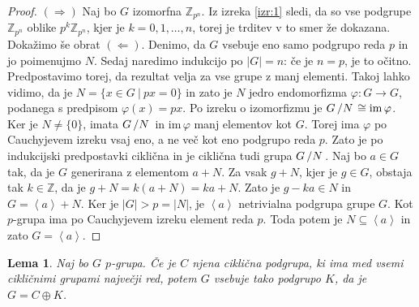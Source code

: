 \documentclass[10pt, a4paper]{article}
\newtheorem{lema}[izr]{Lema}
\newenvironment{noticeC}{%
  \tcolorbox[%
  notitle,
  empty,
  enhanced,  %
  breakable,
  coltext=black, 
  fontupper=\rmfamily,
  parbox=false,
  noparskip,
  sharp corners,
  boxrule=-1pt,  %
  frame hidden,
  left=7pt,  %
  right=7pt,
  top=5pt,
  bottom=5pt,
  before skip=2.5ex plus 2pt,
  after skip=2.5ex plus 2pt,
  overlay unbroken and last={%
  },
  ]}
{\endtcolorbox}
\newenvironment{dokaz}%
  {\begin{noticeC}\begin{proof}}%
  {\end{proof}\end{noticeC}}
\newcommand{\Z}{\mathbb {Z}}
\newcommand{\quot}[2]{{\raisebox{0em}{$#1$}\left/\raisebox{0em}{$#2$}\right.}}
\newcommand{\gen}[1]{\left\langle #1 \right\rangle}
\newcommand{\im}{\mathrm{im}\,}
\begin{document}
\begin{dokaz}
  $(\Rightarrow)$ Naj bo $G$ izomorfna $\Z_{p^n}$. 
  Iz izreka \ref{izr:1} sledi, da so vse podgrupe $\Z_{p^n}$ oblike
  $p^k \Z_{p^n}$, kjer je $k = 0, 1, \dots, n$, torej je trditev v to smer že dokazana.
  Dokažimo še obrat $(\Leftarrow)$.
  Denimo, da $G$ vsebuje eno samo podgrupo reda $p$ in jo poimenujmo $N$.
  Sedaj naredimo indukcijo po $|G| = n$: če je $n = p$, je to očitno.
  Predpostavimo torej, da rezultat velja za vse grupe z manj elementi.
  Takoj lahko vidimo, da je $N = \{x \in G\ |\ px = 0\}$ in zato je $N$ jedro 
  endomorfizma $\varphi: G \to G$, podanega s predpisom $\varphi(x) = px$.
  Po izreku o izomorfizmu je $\quot{G}{N} \cong \im \varphi$.
  Ker je $N \neq \{0\}$, imata $\quot{G}{N}$ in $\im \varphi$
  manj elementov kot $G$. Torej ima $\varphi$ po Cauchyjevem izreku vsaj eno, 
  a ne več kot eno podgrupo reda $p$. Zato je po indukcijski predpostavki ciklična
  in je ciklična tudi grupa $\quot{G}{N}$.
  Naj bo $a \in G$ tak, da je $G$ generirana z elementom $a + N$.
  Za vsak $g + N$, kjer je $g \in G$, obstaja tak $k \in \Z$,
  da je $g + N = k(a + N) = ka + N$. Zato je $g - ka \in N$ in $G = \gen{a} + N$.
  Ker je $|G| > p = |N|$, je $\gen{a}$ netrivialna podgrupa grupe $G$.
  Kot $p$-grupa ima po Cauchyjevem izreku element reda $p$.
  Toda potem je $N \subseteq \gen{a}$ in zato $G = \gen{a}$.
\end{dokaz}
 
\begin{lema}
  Naj bo $G$ $p$-grupa. Če je $C$ njena ciklična podgrupa, ki ima med vsemi 
  cikličnimi grupami največji red, potem $G$ vsebuje tako podgrupo $K$, da je $G = C \oplus K$.
\end{lema}
\end{document}
